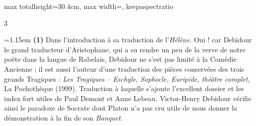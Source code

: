 \documentclass[11pt,twoside]{book}
\newcommand{\italique}[1]{\textit{#1}}
\begin{document}
\begin{adjustbox}{max totalheight=30.4cm, max width=\textwidth, keepaspectratio}
\begin{minipage}{\textwidth}
{\begin{multicols}{3}
\par\vspace{1.2pt}\par\nopagebreak\vspace{1pt}\noindent\hangindent=1.15em {\color{sepiaNote}\textbf{(1)}} Dans l'introduction à sa traduction de l'\italique{Hélène}. Oui ! car Debidour le grand traducteur d'Aristophane, qui a su rendre un peu de la verve de notre poète dans la langue de Rabelais, Debidour ne s'est pas limité à la Comédie Ancienne ; il est aussi l'auteur d'une traduction des pièces conservées des trois grands Tragiques : \italique{Les Tragiques -- Eschyle, Sophocle, Euripide, théâtre complet}, La Pochothèque (1999). Traduction à laquelle s'ajoute l'excellent dossier et les index fort utiles de Paul Demont et Anne Lebeau. Victor-Henry Debidour vérifie ainsi le paradoxe de Socrate dont Platon n'a pas cru utile de nous donner la démonstration à la fin de son \italique{Banquet}.
\par\end{multicols}}
\end{minipage}\end{adjustbox}
\newpage
\end{document}
